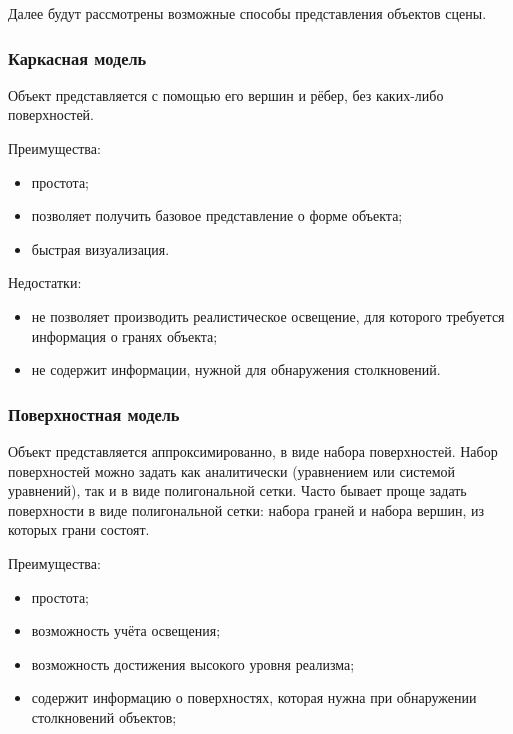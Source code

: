Далее будут рассмотрены возможные способы представления объектов сцены.

\subsubsection{Каркасная модель}

Объект представляется с помощью его вершин и рёбер, без каких-либо поверхностей.

Преимущества:
\begin{itemize}
    \item простота;
    \item позволяет получить базовое представление о форме объекта;
    \item быстрая визуализация.
\end{itemize}

Недостатки:
\begin{itemize}
    \item не позволяет производить реалистическое освещение, для которого требуется информация о гранях объекта;
    \item не содержит информации, нужной для обнаружения столкновений.
\end{itemize}

\subsubsection{Поверхностная модель}

Объект представляется аппроксимированно, в виде набора поверхностей.
Набор поверхностей можно задать как аналитически (уравнением или системой уравнений), так и в виде полигональной сетки.
Часто бывает проще задать поверхности в виде полигональной сетки: набора граней и набора вершин, из которых грани состоят.

Преимущества:
\begin{itemize}
    \item простота;
    \item возможность учёта освещения;
    \item возможность достижения высокого уровня реализма;
    \item содержит информацию о поверхностях, которая нужна при обнаружении столкновений объектов;
\end{itemize}

